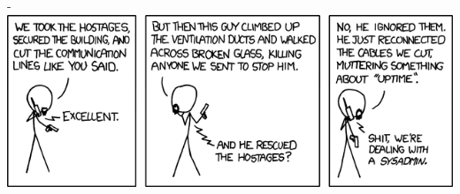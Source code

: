 






\maketitle

\vfill
\begin{center}-
\includegraphics[scale=0.5]{images/0705.png}
\end{center}



\newpage
\tableofcontents
\newpage


